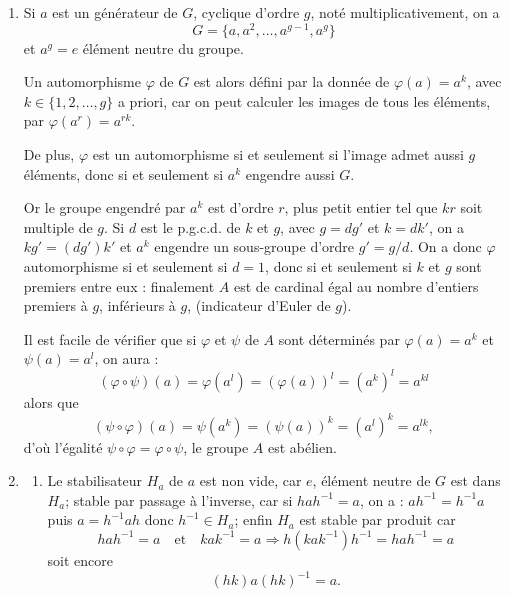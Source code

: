 \begin{enumerate}[label=\arabic*.,leftmargin=2.2em,itemsep=1.2em]
Soit alors le groupe multiplicatif $(\mathbb R^*)^n$ pour la loi
\[
(x_1,\ldots,x_n)\cdot(y_1,\ldots,y_n)=(x_1y_1,\ldots,x_ny_n).
\]
On vérifie que l'application $\varphi:G\longrightarrow(\mathbb R^*)^n$ définie par
\[
\varphi(M)=(m_{11},\ldots,m_{nn})
\]
est un morphisme de groupe et $H$ en est le noyau, d'où $H$ sous-groupe distingué de $G$.

\item Si $a$ est un générateur de $G$, cyclique d'ordre $g$, noté multiplicativement, on a
\[
G=\{a,a^2,\ldots,a^{g-1},a^g\}
\]
et $a^g=e$ élément neutre du groupe.

Un automorphisme $\varphi$ de $G$ est alors défini par la donnée de $\varphi(a)=a^k$, avec $k\in\{1,2,\ldots,g\}$ a priori, car on peut calculer les images de tous les éléments, par $\varphi(a^r)=a^{rk}$.

De plus, $\varphi$ est un automorphisme si et seulement si l'image admet aussi $g$ éléments, donc si et seulement si $a^k$ engendre aussi $G$.

Or le groupe engendré par $a^k$ est d'ordre $r$, plus petit entier tel que $kr$ soit multiple de $g$. Si $d$ est le p.g.c.d. de $k$ et $g$, avec $g=dg'$ et $k=dk'$, on a $kg'=(dg')k'$ et $a^k$ engendre un sous-groupe d'ordre $g'=g/d$. On a donc $\varphi$ automorphisme si et seulement si $d=1$, donc si et seulement si $k$ et $g$ sont premiers entre eux : finalement $A$ est de cardinal égal au nombre d'entiers premiers à $g$, inférieurs à $g$, (indicateur d'Euler de $g$).

Il est facile de vérifier que si $\varphi$ et $\psi$ de $A$ sont déterminés par $\varphi(a)=a^k$ et $\psi(a)=a^l$, on aura :
\[
(\varphi\circ\psi)(a)=\varphi(a^l)=(\varphi(a))^l=(a^k)^l=a^{kl}
\]
alors que
\[
(\psi\circ\varphi)(a)=\psi(a^k)=(\psi(a))^k=(a^l)^k=a^{lk},
\]
d'où l'égalité $\psi\circ\varphi=\varphi\circ\psi$, le groupe $A$ est abélien.

\item
\begin{enumerate}[label=\arabic*),leftmargin=2em]
\item Le stabilisateur $H_a$ de $a$ est non vide, car $e$, élément neutre de $G$ est dans $H_a$; stable par passage à l'inverse, car si $hah^{-1}=a$, on a : $ah^{-1}=h^{-1}a$ puis $a=h^{-1}ah$ donc $h^{-1}\in H_a$; enfin $H_a$ est stable par produit car
\[
hah^{-1}=a\quad\text{et}\quad kak^{-1}=a
\Rightarrow h(kak^{-1})h^{-1}=hah^{-1}=a
\]
soit encore
\[
(hk)a(hk)^{-1}=a.
\]


\end{enumerate}
\end{enumerate}
